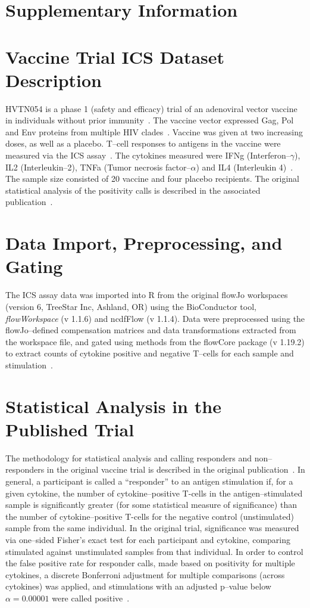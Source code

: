 \documentclass[11pt]{article}
\begin{document}
\section*{Supplementary Information}
\section{Vaccine Trial ICS Dataset Description}
\label{supp:data}
HVTN054 is a phase 1 (safety and efficacy) trial of an adenoviral vector vaccine in individuals without prior immunity~\cite{Peiperl:2010ej}. The vaccine vector expressed Gag, Pol and Env proteins from multiple HIV clades~\cite{Peiperl:2010ej}. Vaccine was given at two increasing doses, as well as a placebo. T--cell responses to antigens in the vaccine were measured via the ICS assay~\cite{Peiperl:2010ej,Horton:2007tsa}. The cytokines measured were IFNg (Interferon--$\gamma$), IL2 (Interleukin--2), TNFa (Tumor necrosis factor--$\alpha$) and IL4 (Interleukin 4)~\cite{Horton:2007tsa}. The sample size consisted of 20 vaccine and four placebo recipients. The original statistical analysis of the positivity calls is described in the associated publication~\cite{Peiperl:2010ej}.
 
 
\section{Data Import, Preprocessing, and Gating}
The ICS assay data was imported into R from the original flowJo workspaces (version 6, TreeStar Inc, Ashland, OR)  using the BioConductor tool, \textit{flowWorkspace} (v 1.1.6) and ncdfFlow (v 1.1.4). Data were preprocessed using the flowJo--defined compensation matrices and data transformations extracted from the workspace file, and gated using methods from the flowCore package (v 1.19.2) to extract counts of cytokine positive and negative T--cells for each sample and stimulation~\cite{Hahne:2009vv}.

\section{Statistical Analysis in the Published Trial}
\label{supp:statpublished}
The methodology for statistical analysis and calling responders and non--responders in the original vaccine trial is described in the original publication~\cite{Peiperl:2010ej}. In general, a participant is called a ``responder'' to an antigen stimulation if, for a given cytokine, the number of cytokine--positive T-cells in the antigen--stimulated sample is significantly greater (for some statistical measure of significance) than the number of cytokine--positive T-cells for the negative control (unstimulated) sample from the same individual. In the original trial, significance was measured via one--sided Fisher's exact test for each participant and cytokine, comparing stimulated against unstimulated samples from that individual. In order to control the false positive rate for responder calls, made based on positivity for multiple cytokines, a discrete Bonferroni adjustment for multiple comparisons (across cytokines) was applied, and stimulations with an adjusted p--value below $\alpha = 0.00001$ were called positive~\cite{Horton:2007tsa}. 
\end{document}
